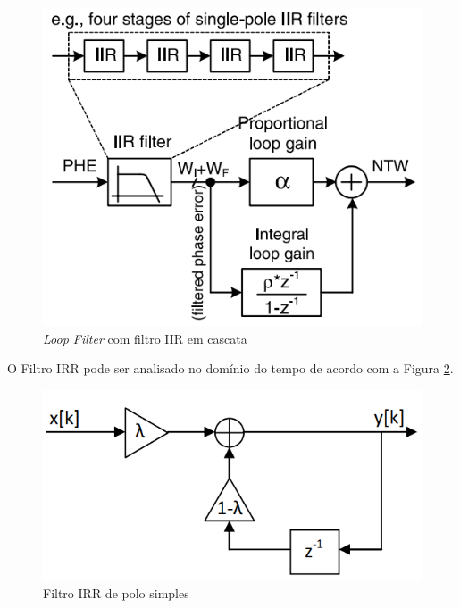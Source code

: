 \begin{figure}[h!]
	\caption{\textit{Loop Filter} com filtro IIR em cascata}
	\begin{center}
		\includegraphics[scale=0.8]{img/filter_IRR.png}
	\end{center}
	\label{fig:filter_IRR}
\end{figure}

O Filtro IRR pode ser analisado no domínio do tempo de acordo com a Figura \ref{fig:filter_IRR_time_domain}.

\begin{figure}[h!]
	\caption{Filtro IRR de polo simples}
	\begin{center}
		\includegraphics[scale=0.8]{img/filter_IRR_time_domain.png}
	\end{center}
	\label{fig:filter_IRR_time_domain}
\end{figure}

